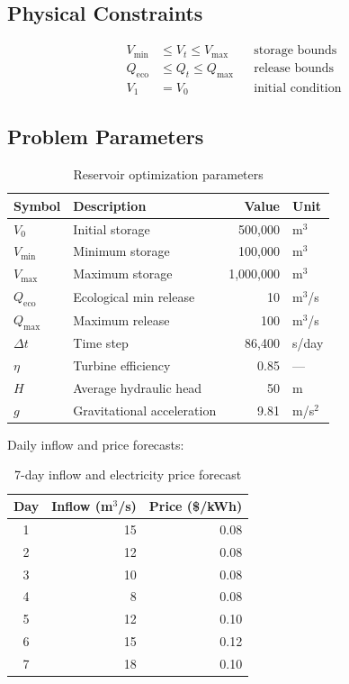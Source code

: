 \documentclass[12pt, a4paper]{article}
\begin{document}
\subsection{Physical Constraints}

\begin{align}
  V_{\min} &\leq V_t \leq V_{\max} && \text{storage bounds} \\
  Q_{\text{eco}} &\leq Q_t \leq Q_{\max} && \text{release bounds} \\
  V_1 &= V_0 && \text{initial condition}
\end{align}

\subsection{Problem Parameters}

\begin{table}[H]
  \centering
  \caption{Reservoir optimization parameters}
  \begin{tabular}{llrl}
    \toprule
    \textbf{Symbol} & \textbf{Description} & \textbf{Value} & \textbf{Unit} \\
    \midrule
    $V_0$           & Initial storage          & 500{,}000  & m$^3$ \\
    $V_{\min}$      & Minimum storage          & 100{,}000  & m$^3$ \\
    $V_{\max}$      & Maximum storage          & 1{,}000{,}000 & m$^3$ \\
    $Q_{\text{eco}}$& Ecological min release   & 10         & m$^3$/s \\
    $Q_{\max}$      & Maximum release          & 100        & m$^3$/s \\
    $\Delta t$      & Time step                & 86{,}400   & s/day \\
    $\eta$          & Turbine efficiency       & 0.85       & --- \\
    $H$             & Average hydraulic head   & 50         & m \\
    $g$             & Gravitational acceleration & 9.81     & m/s$^2$ \\
    \bottomrule
  \end{tabular}
\end{table}

\noindent Daily inflow and price forecasts:

\begin{table}[H]
  \centering
  \caption{7-day inflow and electricity price forecast}
  \begin{tabular}{crr}
    \toprule
    \textbf{Day} & \textbf{Inflow (m$^3$/s)} & \textbf{Price (\$/kWh)} \\
    \midrule
    1 & 15 & 0.08 \\
    2 & 12 & 0.08 \\
    3 & 10 & 0.08 \\
    4 &  8 & 0.08 \\
    5 & 12 & 0.10 \\
    6 & 15 & 0.12 \\
    7 & 18 & 0.10 \\
    \bottomrule
  \end{tabular}
\end{table}
\end{document}
